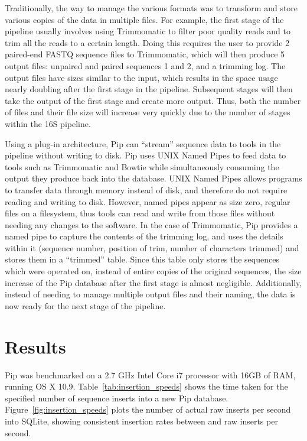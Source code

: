 \documentclass[12pt]{article}
\begin{document}
	Traditionally, the way to manage the various formats was to transform and store
	various copies of the data in multiple files. For example, the first stage of 
	the pipeline usually involves using Trimmomatic to filter poor quality reads 
	and to trim all the reads to a certain length. Doing this requires the user to
	provide 2 paired-end FASTQ sequence files to Trimmomatic, which will then produce
	5 output files: unpaired and paired sequences 1 and 2, and a trimming log. The 
	output files have sizes similar to the input, which results in the space usage
	nearly doubling after the first stage in the pipeline. Subsequent stages will
	then take the output of the first stage and create more output. Thus, both
	the number of files and their file size will increase very quickly due to the 
	number of stages within the 16S pipeline.
	
	Using a plug-in architecture, Pip can ``stream'' sequence data to tools in the
	pipeline without writing to disk. Pip uses UNIX Named Pipes to 
	feed data to tools such as Trimmomatic and Bowtie while simultaneously consuming the output
	they produce back into the database. UNIX Named Pipes allows programs to transfer
	data through memory instead of disk, and therefore do not require reading and
	writing to disk. However, named pipes appear as size zero, regular files on a filesystem,
	thus tools can read and write from those files without needing any changes
	to the software. In the case of Trimmomatic, Pip provides a named pipe to capture
	the contents of the trimming log, and uses the details within it (sequence number, 
	position of trim, number of characters trimmed) and stores them in a ``trimmed''
	table. Since this table only stores the sequences which were operated on, instead 
	of entire copies of the original sequences, the size increase of the Pip database
	after the first stage is almost negligible. Additionally, instead of needing to
	manage multiple output files and their naming, the data is now ready for the 
	next stage of the pipeline.

\section{Results} %
\label{sec:results}
Pip was benchmarked on a 2.7 GHz Intel Core i7 processor with 16GB of RAM, running
OS X 10.9. Table~\ref{tab:insertion_speeds} shows the time taken for the specified number
of sequence inserts into a new Pip database. Figure~\ref{fig:insertion_speeds} plots the
number of actual raw inserts per second into SQLite, showing consistent insertion 
rates between  and  raw inserts per second.
\end{document}
